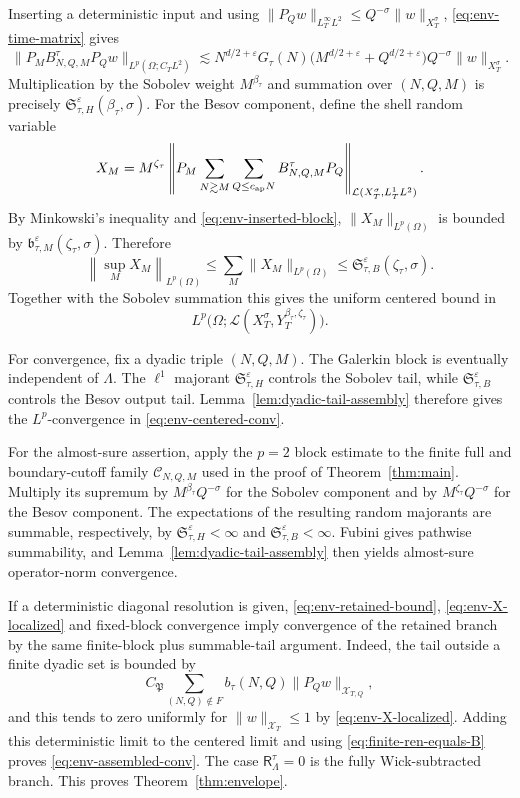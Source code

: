 \documentclass[11pt,reqno]{amsart}
\numberwithin{equation}{section}
\theoremstyle{plain}
\theoremstyle{definition}
\newcommand{\cL}{\mathcal L}
\newcommand{\eps}{\varepsilon}
\newcommand{\Ret}{\mathsf R}
\begin{document}
Inserting a deterministic input and using
\(\|P_Qw\|_{L_T^\infty L^2}\le Q^{-\sigma}\|w\|_{X_T^\sigma}\),
\eqref{eq:env-time-matrix} gives
\begin{equation}\label{eq:env-inserted-block}
        \|P_MB_{N,Q,M}^\tau P_Qw\|_{L^p(\Omega;C_TL^2)}
        \lesssim
        N^{d/2+\eps}G_\tau(N)
        \bigl(M^{d/2+\eps}+Q^{d/2+\eps}\bigr)
        Q^{-\sigma}\|w\|_{X_T^\sigma} .
\end{equation}
Multiplication by the Sobolev weight \(M^{\beta_\tau}\) and summation over \((N,Q,M)\) is precisely \(\mathfrak S_{\tau,H}^{\eps}(\beta_\tau,\sigma)\).  For the Besov component, define the shell random variable
\[
        X_M= M^{\zeta_\tau}
        \left\|P_M\sum_{N\gtrsim M}\sum_{Q\le c_{\rm ap}N}
        B_{N,Q,M}^\tau P_Q\right\|_{\cL(X_T^\sigma,L_T^1L^2)} .
\]
By Minkowski's inequality and \eqref{eq:env-inserted-block}, \(\|X_M\|_{L^p(\Omega)}\) is bounded by \(\mathfrak b_{\tau,M}^{\eps}(\zeta_\tau,\sigma)\).  Therefore
\[
        \left\|\sup_M X_M\right\|_{L^p(\Omega)}
        \le \sum_M \|X_M\|_{L^p(\Omega)}
        \le \mathfrak S_{\tau,B}^{\eps}(\zeta_\tau,\sigma).
\]
Together with the Sobolev summation this gives the uniform centered bound in
\[
        L^p\bigl(\Omega;\cL(X_T^\sigma,Y_T^{\beta_\tau,\zeta_\tau})\bigr).
\]

For convergence, fix a dyadic triple \((N,Q,M)\).  The Galerkin block is
eventually independent of \(\Lambda\).  The \(\ell^1\) majorant
\(\mathfrak S_{\tau,H}^{\eps}\) controls the Sobolev tail, while
\(\mathfrak S_{\tau,B}^{\eps}\) controls the Besov output tail.
Lemma~\ref{lem:dyadic-tail-assembly} therefore gives the \(L^p\)-convergence
in \eqref{eq:env-centered-conv}.

For the almost-sure assertion, apply the \(p=2\) block estimate to the finite
full and boundary-cutoff family \(\mathscr C_{N,Q,M}\) used in the proof of
Theorem~\ref{thm:main}.  Multiply its supremum by
\(M^{\beta_\tau}Q^{-\sigma}\) for the Sobolev component and by
\(M^{\zeta_\tau}Q^{-\sigma}\) for the Besov component.  The expectations of
the resulting random majorants are summable, respectively, by
\(\mathfrak S_{\tau,H}^{\eps}<\infty\) and
\(\mathfrak S_{\tau,B}^{\eps}<\infty\).  Fubini gives pathwise summability,
and Lemma~\ref{lem:dyadic-tail-assembly} then yields almost-sure
operator-norm convergence.

If a deterministic diagonal resolution is given, \eqref{eq:env-retained-bound}, \eqref{eq:env-X-localized} and fixed-block convergence imply convergence of the retained branch by the same finite-block plus summable-tail argument.  Indeed, the tail outside a finite dyadic set is bounded by
\[
        C_{\mathfrak P}\sum_{(N,Q)\notin F} b_\tau(N,Q)\|P_Qw\|_{\mathcal X_{T,Q}},
\]
and this tends to zero uniformly for \(\|w\|_{\mathcal X_T}\le1\) by \eqref{eq:env-X-localized}.  Adding this deterministic limit to the centered limit and using \eqref{eq:finite-ren-equals-B} proves \eqref{eq:env-assembled-conv}.  The case \(\Ret^\tau_\Lambda=0\) is the fully Wick-subtracted branch.  This proves Theorem~\ref{thm:envelope}.
\end{document}
